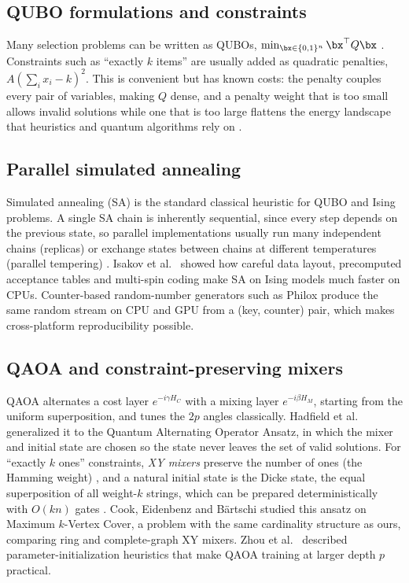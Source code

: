 \subsection{QUBO formulations and constraints}

Many selection problems can be written as QUBOs, $\min_{\bx\in\{0,1\}^n} \bx^\top Q \bx$ \cite{glover2019tutorial,lucas2014ising}. Constraints such as ``exactly $k$ items'' are usually added as quadratic penalties, $A(\sum_i x_i - k)^2$. This is convenient but has known costs: the penalty couples every pair of variables, making $Q$ dense, and a penalty weight that is too small allows invalid solutions while one that is too large flattens the energy landscape that heuristics and quantum algorithms rely on \cite{glover2019tutorial}.

\subsection{Parallel simulated annealing}

Simulated annealing (SA) \cite{kirkpatrick1983optimization} is the standard classical heuristic for QUBO and Ising problems. A single SA chain is inherently sequential, since every step depends on the previous state, so parallel implementations usually run many independent chains (replicas) or exchange states between chains at different temperatures (parallel tempering) \cite{earl2005parallel}. Isakov et al.\ \cite{isakov2015optimised} showed how careful data layout, precomputed acceptance tables and multi-spin coding make SA on Ising models much faster on CPUs. Counter-based random-number generators such as Philox \cite{salmon2011parallel} produce the same random stream on CPU and GPU from a (key, counter) pair, which makes cross-platform reproducibility possible.

\subsection{QAOA and constraint-preserving mixers}

QAOA \cite{farhi2014qaoa} alternates a cost layer $e^{-i\gamma H_C}$ with a mixing layer $e^{-i\beta H_M}$, starting from the uniform superposition, and tunes the $2p$ angles classically. Hadfield et al.\ \cite{hadfield2019qaoa} generalized it to the Quantum Alternating Operator Ansatz, in which the mixer and initial state are chosen so the state never leaves the set of valid solutions. For ``exactly $k$ ones'' constraints, \emph{XY mixers} preserve the number of ones (the Hamming weight) \cite{wang2020xy}, and a natural initial state is the Dicke state, the equal superposition of all weight-$k$ strings, which can be prepared deterministically with $O(kn)$ gates \cite{bartschi2019dicke}. Cook, Eidenbenz and B\"artschi \cite{cook2020kvertex} studied this ansatz on Maximum $k$-Vertex Cover, a problem with the same cardinality structure as ours, comparing ring and complete-graph XY mixers. Zhou et al.\ \cite{zhou2020qaoa} described parameter-initialization heuristics that make QAOA training at larger depth $p$ practical.

